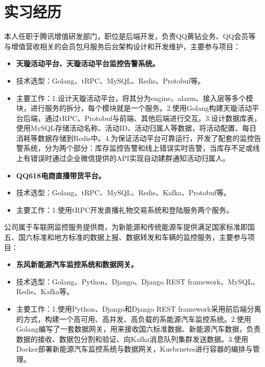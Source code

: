 \documentclass{resume}
\begin{document}

\section{实习经历}
\begin{onehalfspacing}
本人任职于腾讯增值研发部门，职位是后端开发，负责QQ黄钻业务、QQ会员等与增值营收相关的会员包月服务后台架构设计和开发维护，主要参与项目：
\begin{itemize}
  \item \textbf{天璇活动平台、天璇活动平台监控告警系统。}
  \item 技术选型：Golang、tRPC、MySQL、Redis、Protobuf等。
  \item 主要工作：1.设计天璇活动平台，将其分为engine、alarm、接入层等多个模块，进行服务的拆分，每个模块就是一个服务。2.使用Golang构建天璇活动平台后端，通过tRPC、Protobuf与前端、其他后端进行交互。3.设计数据库表，使用MySQL存储活动名称、活动ID、活动归属人等数据，将活动配置、每日消耗等数据存储到Redis中。4.为保证活动平台可靠运行，开发了配套的监控告警系统，分为两个部分：库存监控告警和线上错误实时告警，当库存不足或线上有错误时通过企业微信提供的API实现自动建群通知活动归属人。
  \item \textbf{QQ618电商直播带货平台。}
  \item 技术选型：Golang、tRPC、MySQL、Redis、Kafka、Protobuf等。
  \item 主要工作：1.使用tRPC开发直播礼物交易系统和登陆服务两个服务。
\end{itemize}
\end{onehalfspacing}

\begin{onehalfspacing}
公司属于车联网监控服务提供商，为新能源和传统能源车提供满足国家标准即国五、国六标准和地方标准的数据上报、数据转发和车辆的监控服务，主要参与项目：
\begin{itemize}
  \item \textbf{东风新能源汽车监控系统和数据网关。}
  \item 技术选型：Golang、Python、Django、Django REST framework、MySQL、Redis、Kafka等。
  \item 主要工作：1.使用Python、Django和Django REST framework采用前后端分离的方式，构建一个高可用、高并发、高负载的系能源汽车监控系统。2.使用Golang编写了一套数据网关，用来接收国六标准数据、新能源汽车数据，负责数据的接收、数据包分割和验证、向Kafka消息队列集群发送数据。3.使用Docker部署新能源汽车监控系统与数据网关，Kuebrnetes进行容器的编排与管理。
\end{itemize}
\end{onehalfspacing}


%
%
\end{document}
